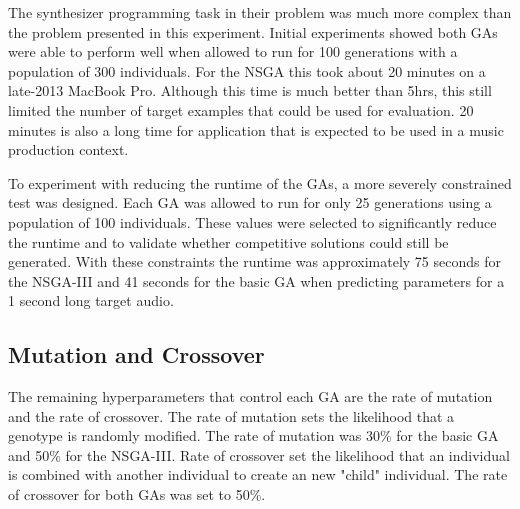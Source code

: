  The synthesizer programming task in their problem was much more complex than the problem presented in this experiment. Initial experiments showed both GAs were able to perform well when allowed to run for 100 generations with a population of 300 individuals. For the NSGA this took about 20 minutes on a late-2013 MacBook Pro. Although this time is much better than 5hrs, this still limited the number of target examples that could be used for evaluation. 20 minutes is also a long time for application that is expected to be used in a music production context. 
 
 To experiment with reducing the runtime of the GAs, a more severely constrained test was designed. Each GA was allowed to run for only 25 generations using a population of 100 individuals. These values were selected to significantly reduce the runtime and to validate whether competitive solutions could still be generated. With these constraints the runtime was approximately 75 seconds for the NSGA-III and 41 seconds for the basic GA when predicting parameters for a 1 second long target audio.
 
 \subsection{Mutation and Crossover}
 The remaining hyperparameters that control each GA are the rate of mutation and the rate of crossover. The rate of mutation sets the likelihood that a genotype is randomly modified. The rate of mutation was 30\% for the basic GA and 50\% for the NSGA-III. Rate of crossover set the likelihood that an individual is combined with another individual to create an new "child" individual. The rate of crossover for both GAs was set to 50\%.





